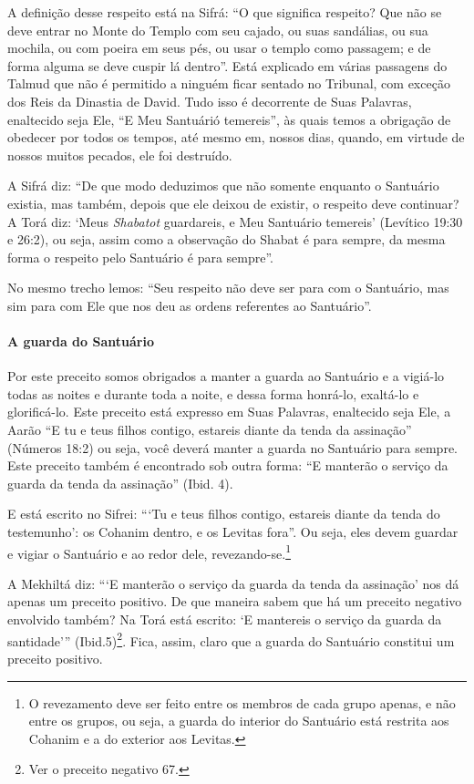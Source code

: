 A definição desse respeito está na Sifrá: ``O que significa respeito?
Que não se deve entrar no Monte do Templo com seu cajado, ou suas
sandálias, ou sua mochila, ou com poeira em seus pés, ou usar o templo
como passagem; e de forma alguma se deve cuspir lá dentro''. Está
explicado em várias passagens do Talmud que não é permitido a ninguém
ficar sentado no Tribunal, com exceção dos Reis da Dinastia de David.
Tudo isso é decorrente de Suas Palavras, enaltecido seja Ele, ``E Meu
Santuárió temereis'', às quais temos a obrigação de obedecer por todos
os tempos, até mesmo em, nossos dias, quando, em virtude de nossos
muitos pecados, ele foi destruído.

A Sifrá diz: ``De que modo deduzimos que não somente enquanto o
Santuário existia, mas também, depois que ele deixou de existir, o
respeito deve continuar? A Torá diz: `Meus \emph{Shabatot} guardareis,
e Meu Santuário temereis' (Levítico 19:30 e 26:2), ou seja, assim como a observação do
Shabat é para sempre, da mesma forma o respeito pelo Santuário é para
sempre''.

No mesmo trecho lemos: ``Seu respeito não deve ser para com o Santuário,
mas sim para com Ele que nos deu as ordens referentes ao Santuário''.

\paragraph{A guarda do Santuário}

Por este preceito somos obrigados a manter a guarda ao Santuário e a
vigiá-lo todas as noites e durante toda a noite, e dessa forma honrá-lo,
exaltá-lo e glorificá-lo. Este preceito está expresso em Suas Palavras,
enaltecido seja Ele, a Aarão ``E tu e teus filhos contigo, estareis
diante da tenda da assinação'' (Números 18:2) ou seja, você deverá
manter a guarda no Santuário para sempre. Este preceito também é
encontrado sob outra forma: ``E manterão o serviço da guarda da tenda da
assinação'' (Ibid. 4).


E está escrito no Sifrei: ```Tu e teus filhos contigo, estareis diante
da tenda do testemunho': os Cohanim dentro, e os Levitas fora''. Ou
seja, eles devem guardar e vigiar o Santuário e ao redor dele,
revezando-se.\footnote{O revezamento deve ser feito entre os membros de cada grupo apenas, e
  não entre os grupos, ou seja, a guarda do interior do Santuário está
  restrita aos Cohanim e a do exterior aos Levitas.}

A Mekhiltá diz: ```E manterão o serviço da guarda da tenda da assinação'
nos dá apenas um preceito positivo. De que maneira sabem que há um
preceito negativo envolvido também? Na Torá está escrito: `E mantereis
o serviço da guarda da santidade''' (Ibid.5)\footnote{Ver o preceito negativo 67.}. Fica, assim, claro que a guarda do Santuário constitui um preceito positivo.

